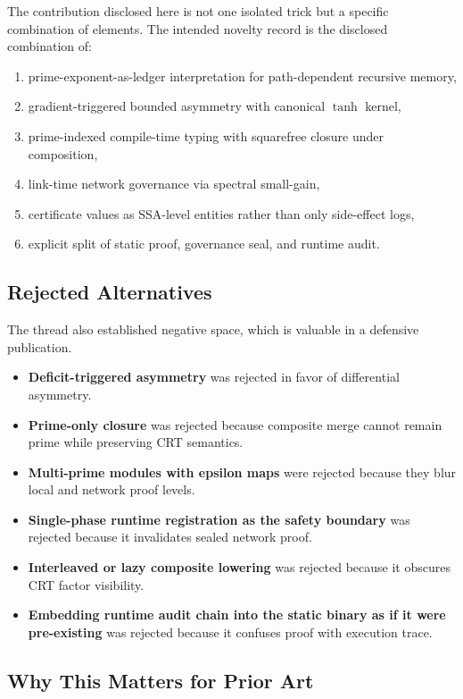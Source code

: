 \documentclass[11pt]{article}
\begin{document}
The contribution disclosed here is not one isolated trick but a specific combination of elements. The intended novelty record is the disclosed combination of:

\begin{enumerate}[leftmargin=2em]
  \item prime-exponent-as-ledger interpretation for path-dependent recursive memory,
  \item gradient-triggered bounded asymmetry with canonical \(\tanh\) kernel,
  \item prime-indexed compile-time typing with squarefree closure under composition,
  \item link-time network governance via spectral small-gain,
  \item certificate values as SSA-level entities rather than only side-effect logs,
  \item explicit split of static proof, governance seal, and runtime audit.
\end{enumerate}

\subsection{Rejected Alternatives}

The thread also established negative space, which is valuable in a defensive publication.

\begin{itemize}[leftmargin=2em]
  \item \textbf{Deficit-triggered asymmetry} was rejected in favor of differential asymmetry.
  \item \textbf{Prime-only closure} was rejected because composite merge cannot remain prime while preserving CRT semantics.
  \item \textbf{Multi-prime modules with epsilon maps} were rejected because they blur local and network proof levels.
  \item \textbf{Single-phase runtime registration as the safety boundary} was rejected because it invalidates sealed network proof.
  \item \textbf{Interleaved or lazy composite lowering} was rejected because it obscures CRT factor visibility.
  \item \textbf{Embedding runtime audit chain into the static binary as if it were pre-existing} was rejected because it confuses proof with execution trace.
\end{itemize}

\subsection{Why This Matters for Prior Art}
\end{document}
